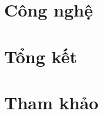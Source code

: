 \documentclass[a4paper]{report}
\theoremstyle{definition}
\begin{document}
% 

\newpage
% 

\newpage
% 

\newpage
% 

\newpage
% 

\newpage
% 


\chapter{Công nghệ}



\chapter{Tổng kết}



\chapter{Tham khảo}


\end{document}
